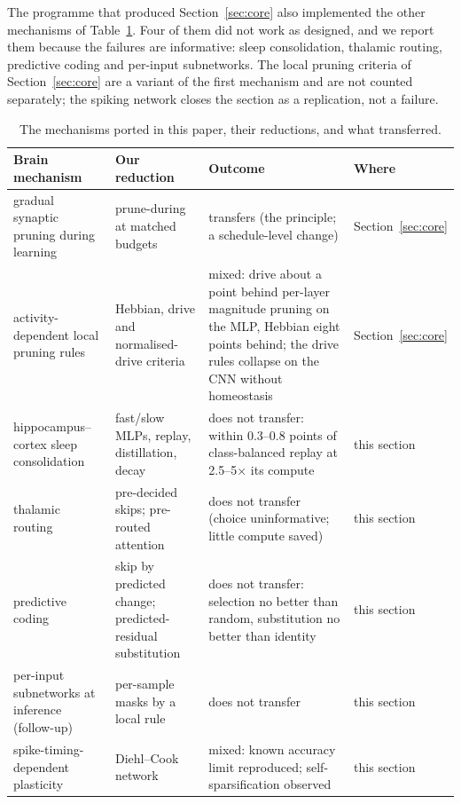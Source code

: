 \documentclass[11pt]{article}
\begin{document}
The programme that produced Section~\ref{sec:core} also implemented the other mechanisms of Table~\ref{tab:map}. Four
of them did not work as designed, and we report them because the failures are informative: sleep consolidation, thalamic
routing, predictive coding and per-input subnetworks. The local pruning criteria of Section~\ref{sec:core} are a variant of
the first mechanism and are not counted separately; the spiking network closes the section as a replication, not a
failure.

\begin{table}[t]
\centering\small
\caption{The mechanisms ported in this paper, their reductions, and what transferred.}
\label{tab:map}
\footnotesize
\begin{tabular}{@{}p{3.2cm}p{4.4cm}p{5.0cm}p{2.0cm}@{}}
\toprule
Brain mechanism & Our reduction & Outcome & Where \\
\midrule
gradual synaptic pruning during learning & prune-during at matched budgets & transfers (the principle; a schedule-level change) & Section~\ref{sec:core} \\
activity-dependent local pruning rules & Hebbian, drive and normalised-drive criteria & mixed: drive about a point behind per-layer magnitude pruning on the MLP, Hebbian eight points behind; the drive rules collapse on the CNN without homeostasis & Section~\ref{sec:core} \\
hippocampus--cortex sleep consolidation & fast/slow MLPs, replay, distillation, decay & does not transfer: within 0.3--0.8 points of class-balanced replay at 2.5--5$\times$ its compute & this section \\
thalamic routing & pre-decided skips; pre-routed attention & does not transfer (choice uninformative; little compute saved) & this section \\
predictive coding & skip by predicted change; predicted-residual substitution & does not transfer: selection no better than random, substitution no better than identity & this section \\
per-input subnetworks at inference (follow-up) & per-sample masks by a local rule & does not transfer & this section \\
spike-timing-dependent plasticity & Diehl--Cook network & mixed: known accuracy limit reproduced; self-sparsification observed & this section \\
\bottomrule
\end{tabular}
\end{table}
\end{document}

